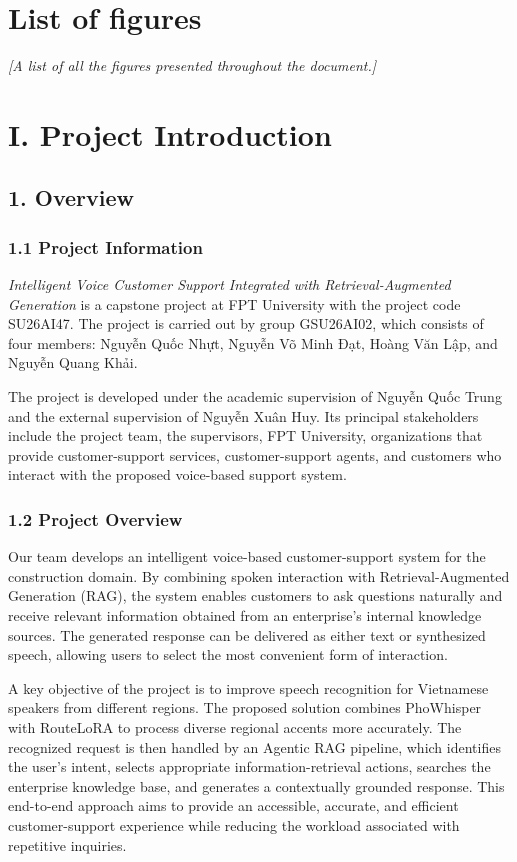 \documentclass[11pt,a4paper]{article}
\makeatletter
\newcommand{\guidance}[1]{%
  {\color{guidanceblue}\itshape [#1]\par}%
}
\newcommand{\chapterstart}[1]{\clearpage\section{#1}}
\newcommand{\vietnamesetext}[1]{#1}
\newcommand{\printlistoffigures}{\@starttoc{lof}}
\newcommand{\ProjectName}{Intelligent Voice Customer Support Integrated with Retrieval-Augmented Generation}
\newcommand{\GroupName}{GSU26AI02}
\newcommand{\MemberOneName}{\vietnamesetext{Nguyễn Quốc Nhựt}}
\newcommand{\MemberTwoName}{\vietnamesetext{Nguyễn Võ Minh Đạt}}
\newcommand{\MemberThreeName}{\vietnamesetext{Hoàng Văn Lập}}
\newcommand{\MemberFourName}{\vietnamesetext{Nguyễn Quang Khải}}
\newcommand{\SupervisorName}{\vietnamesetext{Nguyễn Quốc Trung}}
\newcommand{\ExternalSupervisorName}{\vietnamesetext{Nguyễn Xuân Huy}}
\newcommand{\CapstoneCode}{SU26AI47}
\makeatother
\begin{document}
\section{List of figures}
\guidance{A list of all the figures presented throughout the document.}
\printlistoffigures

\clearpage
{}
\chapterstart{I. Project Introduction}

\subsection{1. Overview}

\subsubsection{1.1 Project Information}

\textit{\ProjectName} is a capstone project at FPT University with the project
code \CapstoneCode. The project is carried out by group \GroupName, which
consists of four members: \MemberOneName, \MemberTwoName, \MemberThreeName,
and \MemberFourName.

The project is developed under the academic supervision of \SupervisorName{}
and the external supervision of \ExternalSupervisorName. Its principal
stakeholders include the project team, the supervisors, FPT University,
organizations that provide customer-support services, customer-support agents,
and customers who interact with the proposed voice-based support system.

\subsubsection{1.2 Project Overview}

Our team develops an intelligent voice-based customer-support system for the construction domain. By combining spoken interaction with Retrieval-Augmented Generation (RAG), the system enables customers to ask questions naturally and receive relevant information obtained from an enterprise's internal knowledge sources. The generated response can be delivered as either text or synthesized speech, allowing users to select the most convenient form of interaction.

A key objective of the project is to improve speech recognition for Vietnamese
speakers from different regions. The proposed solution combines PhoWhisper with
RouteLoRA to process diverse regional accents more accurately. The recognized
request is then handled by an Agentic RAG pipeline, which identifies the user's
intent, selects appropriate information-retrieval actions, searches the
enterprise knowledge base, and generates a contextually grounded response.
This end-to-end approach aims to provide an accessible, accurate, and efficient
customer-support experience while reducing the workload associated with
repetitive inquiries.
\end{document}
